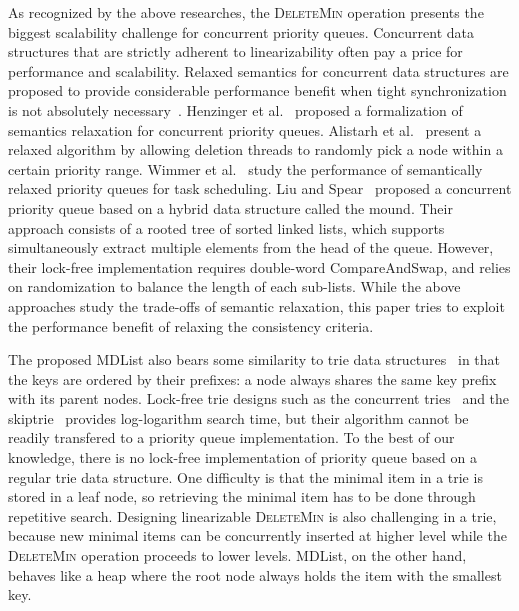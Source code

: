 \documentclass[10pt,journal,letterpaper,compsoc]{IEEEtran}
\begin{document}
As recognized by the above researches, the \textsc{DeleteMin} operation presents the biggest scalability challenge for concurrent priority queues.
Concurrent data structures that are strictly adherent to linearizability often pay a price for performance and scalability.
Relaxed semantics for concurrent data structures are proposed to provide considerable performance benefit when tight synchronization is not absolutely necessary~\cite{afek2010quasi,henzinger2013quantitative}.
Henzinger et al.~\cite{henzinger2013quantitative} proposed a formalization of semantics relaxation for concurrent priority queues.
Alistarh et al.~\cite{alistarh2014spraylist} present a relaxed algorithm by allowing deletion threads to randomly pick a node within a certain priority range.
Wimmer et al.~\cite{wimmer2013data} study the performance of semantically relaxed priority queues for task scheduling.
Liu and Spear~\cite{liu2012mounds} proposed a concurrent priority queue based on a hybrid data structure called the mound.
Their approach consists of a rooted tree of sorted linked lists, which supports simultaneously extract multiple elements from the head of the queue.
However, their lock-free implementation requires double-word CompareAndSwap, and relies on randomization to balance the length of each sub-lists.
While the above approaches study the trade-offs of semantic relaxation, this paper tries to exploit the performance benefit of relaxing the consistency criteria.

The proposed MDList also bears some similarity to trie data structures~\cite{fredkin1960trie,willard1983log} in that the keys are ordered by their prefixes: a node always shares the same key prefix with its parent nodes.
Lock-free trie designs such as the concurrent tries~\cite{prokopec2012concurrent} and the skiptrie~\cite{oshman2013skiptrie} provides log-logarithm search time, but their algorithm cannot be readily transfered to a priority queue implementation.
To the best of our knowledge, there is no lock-free implementation of priority queue based on a regular trie data structure. 
One difficulty is that the minimal item in a trie is stored in a leaf node, so retrieving the minimal item has to be done through repetitive search.
Designing linearizable \textsc{DeleteMin} is also challenging in a trie, because new minimal items can be concurrently inserted at higher level while the \textsc{DeleteMin} operation proceeds to lower levels.
MDList, on the other hand, behaves like a heap where the root node always holds the item with the smallest key.
\end{document}
